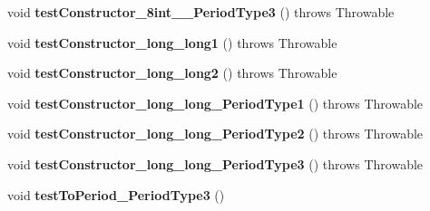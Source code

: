 \begin{DoxyCompactItemize}
\item 
\hypertarget{classorg_1_1joda_1_1time_1_1_test_period___constructors_af4993ed5073544570419975a32e27e33}{void {\bfseries test\-Constructor\-\_\-8int\-\_\-\-\_\-\-Period\-Type3} ()  throws Throwable }\label{classorg_1_1joda_1_1time_1_1_test_period___constructors_af4993ed5073544570419975a32e27e33}

\item 
\hypertarget{classorg_1_1joda_1_1time_1_1_test_period___constructors_a15d894a8e8fa920c9817941019841440}{void {\bfseries test\-Constructor\-\_\-long\-\_\-long1} ()  throws Throwable }\label{classorg_1_1joda_1_1time_1_1_test_period___constructors_a15d894a8e8fa920c9817941019841440}

\item 
\hypertarget{classorg_1_1joda_1_1time_1_1_test_period___constructors_ae70937b691e1db0e84cd50f6325abd00}{void {\bfseries test\-Constructor\-\_\-long\-\_\-long2} ()  throws Throwable }\label{classorg_1_1joda_1_1time_1_1_test_period___constructors_ae70937b691e1db0e84cd50f6325abd00}

\item 
\hypertarget{classorg_1_1joda_1_1time_1_1_test_period___constructors_a980cb2e736c8a341fcb0d91ca405ee9a}{void {\bfseries test\-Constructor\-\_\-long\-\_\-long\-\_\-\-Period\-Type1} ()  throws Throwable }\label{classorg_1_1joda_1_1time_1_1_test_period___constructors_a980cb2e736c8a341fcb0d91ca405ee9a}

\item 
\hypertarget{classorg_1_1joda_1_1time_1_1_test_period___constructors_a941a0dc6fd54b3b6841c226585522128}{void {\bfseries test\-Constructor\-\_\-long\-\_\-long\-\_\-\-Period\-Type2} ()  throws Throwable }\label{classorg_1_1joda_1_1time_1_1_test_period___constructors_a941a0dc6fd54b3b6841c226585522128}

\item 
\hypertarget{classorg_1_1joda_1_1time_1_1_test_period___constructors_a557377b36e538e180497cd1b8fd28fcd}{void {\bfseries test\-Constructor\-\_\-long\-\_\-long\-\_\-\-Period\-Type3} ()  throws Throwable }\label{classorg_1_1joda_1_1time_1_1_test_period___constructors_a557377b36e538e180497cd1b8fd28fcd}

\item 
\hypertarget{classorg_1_1joda_1_1time_1_1_test_period___constructors_a45d22d2985539e7da3f799e201845ad4}{void {\bfseries test\-To\-Period\-\_\-\-Period\-Type3} ()}\label{classorg_1_1joda_1_1time_1_1_test_period___constructors_a45d22d2985539e7da3f799e201845ad4}


\end{DoxyCompactItemize}
